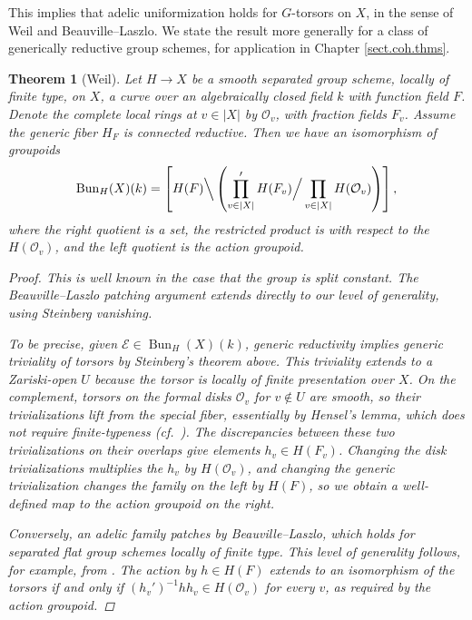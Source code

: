 \documentclass[openany]{amsbook}
\newtheorem{theorem}{Theorem}[chapter]
\theoremstyle{definition}
\theoremstyle{remark}
\numberwithin{equation}{section}
\renewcommand{\O}{\mathcal{O}}
\newcommand{\cE}{\mathcal{E}}
\renewcommand{\-}{\operatorname{-}}
\newcommand{\on}[1]{\operatorname{#1}}
\newcommand{\Bun}{\on{Bun}}
\begin{document}
This implies that adelic uniformization holds for $G$-torsors on $X$, in the sense of Weil and Beauville--Laszlo. We state the result more generally for a class of generically reductive group schemes, for application in Chapter \ref{sect.coh.thms}.
\begin{theorem}[Weil]\label{thm.weil.unif}
Let $H \to X$ be a smooth separated group scheme, locally of finite type, on $X$, a curve over an algebraically closed field $k$ with function field $F$. Denote the complete local rings at $v \in |X|$ by $\O_v$, with fraction fields $F_v$. Assume the generic fiber $H_F$ is connected reductive. Then we have an isomorphism of groupoids
$$
\on{Bun}_H(X)(k) = \left[H(F) \Big\backslash \left(\prod'_{v \in |X|} H(F_v) \Big/\prod_{v\in |X|} H(\O_{v})\right)\right],
$$
where the right quotient is a set, the restricted product is with respect to the $H(\O_v)$, and the left quotient is the action groupoid.
\begin{proof}
    This is well known in the case that the group is split constant. The Beauville--Laszlo patching argument extends directly to our level of generality, using Steinberg vanishing.

    To be precise, given $\cE \in \Bun_H(X)(k)$, generic reductivity implies generic triviality of torsors by Steinberg's theorem above. This triviality extends to a Zariski-open $U$ because the torsor is locally of finite presentation over $X$. On the complement, torsors on the formal disks $\O_v$ for $v \not\in U$ are smooth, so their trivializations lift from the special fiber, essentially by Hensel's lemma, which does not require finite-typeness (cf.\ \cite[Th\'eor\`eme 11.7, Remarque 11.8(3)]{giraudcohofsch}). The discrepancies between these two trivializations on their overlaps give elements $h_v \in H(F_v)$. Changing the disk trivializations multiplies the $h_v$ by $H(\O_v)$, and changing the generic trivialization changes the family on the left by $H(F)$, so we obtain a well-defined map to the action groupoid on the right.

    Conversely, an adelic family patches by Beauville--Laszlo, which holds for separated flat group schemes locally of finite type. This level of generality follows, for example, from \cite[Proposition 3.20]{achingeryoucisBL}. The action by $h \in H(F)$ extends to an isomorphism of the torsors if and only if $(h_v')^{-1} h h_v \in H(\O_v)$ for every $v$, as required by the action groupoid. 
\end{proof}
\end{theorem}
\end{document}
